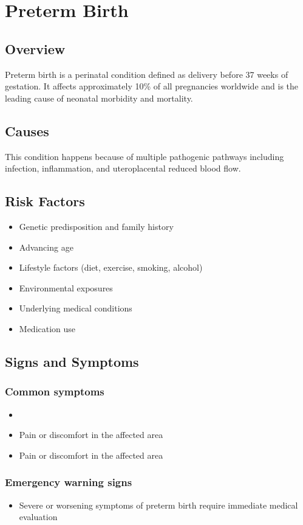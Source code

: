 \chapter{Preterm Birth}
\label{sec:Preterm Birth}

\section{Overview}
Preterm birth is a perinatal condition defined as delivery before 37 weeks of gestation. It affects approximately 10\% of all pregnancies worldwide and is the leading cause of neonatal morbidity and mortality.
\section{Causes}
This condition happens because of multiple pathogenic pathways including infection, inflammation, and uteroplacental reduced blood flow.     
\section{Risk Factors}

\begin{itemize}[noitemsep]
  \item Genetic predisposition and family history
  \item Advancing age
  \item Lifestyle factors (diet, exercise, smoking, alcohol)
  \item Environmental exposures
  \item Underlying medical conditions
  \item Medication use
\end{itemize}
\section{Signs and Symptoms}

\subsection{Common symptoms}
\begin{itemize}[noitemsep]
  \item \item Pain or discomfort in the affected area    \item Pain or discomfort in the affected area
  \end{itemize}

\subsection{Emergency warning signs}
\begin{itemize}[noitemsep]
  \item Severe or worsening symptoms of preterm birth require immediate medical evaluation
\end{itemize}
